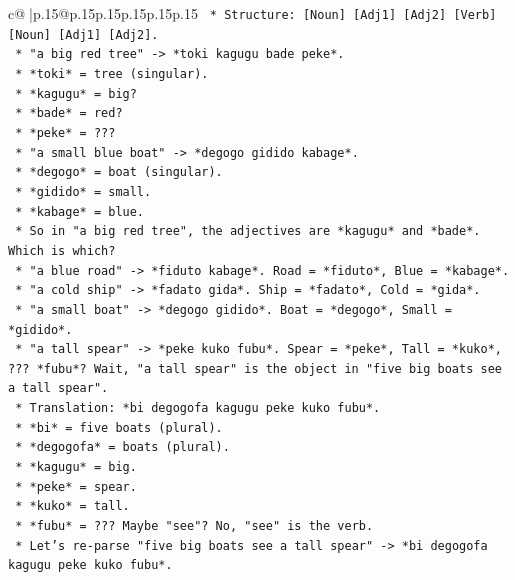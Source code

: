 \documentclass{article}
\begin{document}
{\begin{supertabular}{c@{$\;$}|p{.15\linewidth}@{}p{.15\linewidth}p{.15\linewidth}p{.15\linewidth}p{.15\linewidth}p{.15\linewidth}}
{{{\texttt{            *   Structure: {[}Noun{]} {[}Adj1{]} {[}Adj2{]} {[}Verb{]} {[}Noun{]} {[}Adj1{]} {[}Adj2{]}.} \\
\texttt{            *   "a big red tree" {-}> *toki kagugu bade peke*.} \\
\texttt{                *   *toki* = tree (singular).} \\
\texttt{                *   *kagugu* = big?} \\
\texttt{                *   *bade* = red?} \\
\texttt{                *   *peke* = ???} \\
\texttt{            *   "a small blue boat" {-}> *degogo gidido kabage*.} \\
\texttt{                *   *degogo* = boat (singular).} \\
\texttt{                *   *gidido* = small.} \\
\texttt{                *   *kabage* = blue.} \\
\texttt{            *   So in "a big red tree", the adjectives are *kagugu* and *bade*. Which is which?} \\
\texttt{            *   "a blue road" {-}> *fiduto kabage*. Road = *fiduto*, Blue = *kabage*.} \\
\texttt{            *   "a cold ship" {-}> *fadato gida*. Ship = *fadato*, Cold = *gida*.} \\
\texttt{            *   "a small boat" {-}> *degogo gidido*. Boat = *degogo*, Small = *gidido*.} \\
\texttt{            *   "a tall spear" {-}> *peke kuko fubu*. Spear = *peke*, Tall = *kuko*, ??? *fubu*? Wait, "a tall spear" is the object in "five big boats see a tall spear".} \\
\texttt{            *   Translation: *bi degogofa kagugu peke kuko fubu*.} \\
\texttt{                *   *bi* = five boats (plural).} \\
\texttt{                *   *degogofa* = boats (plural).} \\
\texttt{                *   *kagugu* = big.} \\
\texttt{                *   *peke* = spear.} \\
\texttt{                *   *kuko* = tall.} \\
\texttt{                *   *fubu* = ??? Maybe "see"? No, "see" is the verb.} \\
\texttt{            *   Let's re{-}parse "five big boats see a tall spear" {-}> *bi degogofa kagugu peke kuko fubu*.} \\
}}}
\end{supertabular}}
\end{document}
